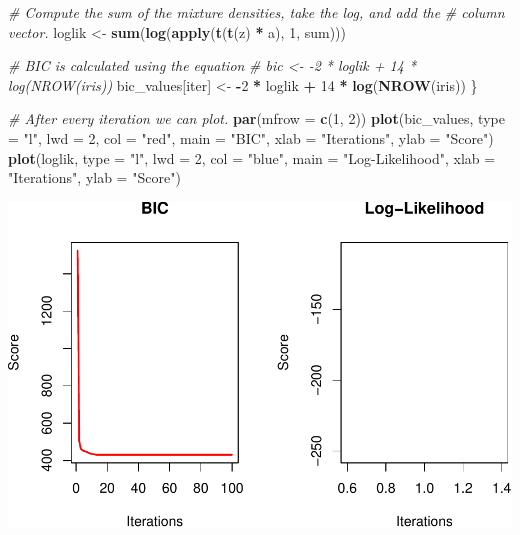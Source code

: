 \documentclass[12pt]{article}
\newenvironment{Shaded}{\begin{snugshade}}{\end{snugshade}}
\newcommand{\AttributeTok}[1]{\textcolor[rgb]{0.13,0.29,0.53}{#1}}
\newcommand{\CommentTok}[1]{\textcolor[rgb]{0.56,0.35,0.01}{\textit{#1}}}
\newcommand{\DecValTok}[1]{\textcolor[rgb]{0.00,0.00,0.81}{#1}}
\newcommand{\FunctionTok}[1]{\textcolor[rgb]{0.13,0.29,0.53}{\textbf{#1}}}
\newcommand{\NormalTok}[1]{#1}
\newcommand{\OtherTok}[1]{\textcolor[rgb]{0.56,0.35,0.01}{#1}}
\newcommand{\SpecialCharTok}[1]{\textcolor[rgb]{0.81,0.36,0.00}{\textbf{#1}}}
\newcommand{\StringTok}[1]{\textcolor[rgb]{0.31,0.60,0.02}{#1}}
\begin{document}
\begin{Shaded}
\begin{Highlighting}[]
\CommentTok{\# Compute the sum of the mixture densities, take the log, and add the}
\CommentTok{\# column vector.}
\NormalTok{loglik }\OtherTok{\textless{}{-}} \FunctionTok{sum}\NormalTok{(}\FunctionTok{log}\NormalTok{(}\FunctionTok{apply}\NormalTok{(}\FunctionTok{t}\NormalTok{(}\FunctionTok{t}\NormalTok{(z) }\SpecialCharTok{*}\NormalTok{ a), }\DecValTok{1}\NormalTok{, sum)))}

\CommentTok{\# BIC is calculated using the equation}
\CommentTok{\# bic \textless{}{-} {-}2 * loglik + 14 * log(NROW(iris))}
\NormalTok{bic\_values[iter] }\OtherTok{\textless{}{-}} \SpecialCharTok{{-}}\DecValTok{2} \SpecialCharTok{*}\NormalTok{ loglik }\SpecialCharTok{+} \DecValTok{14} \SpecialCharTok{*} \FunctionTok{log}\NormalTok{(}\FunctionTok{NROW}\NormalTok{(iris))}
\NormalTok{\}}
\end{Highlighting}
\end{Shaded}

\begin{Shaded}
\begin{Highlighting}[]
\CommentTok{\# After every iteration we can plot.}
\FunctionTok{par}\NormalTok{(}\AttributeTok{mfrow =} \FunctionTok{c}\NormalTok{(}\DecValTok{1}\NormalTok{, }\DecValTok{2}\NormalTok{))}
\FunctionTok{plot}\NormalTok{(bic\_values, }\AttributeTok{type =} \StringTok{"l"}\NormalTok{, }\AttributeTok{lwd =} \DecValTok{2}\NormalTok{, }\AttributeTok{col =} \StringTok{"red"}\NormalTok{, }\AttributeTok{main =} \StringTok{"BIC"}\NormalTok{, }\AttributeTok{xlab =} \StringTok{"Iterations"}\NormalTok{, }
    \AttributeTok{ylab =} \StringTok{"Score"}\NormalTok{)}
\FunctionTok{plot}\NormalTok{(loglik, }\AttributeTok{type =} \StringTok{"l"}\NormalTok{, }\AttributeTok{lwd =} \DecValTok{2}\NormalTok{, }\AttributeTok{col =} \StringTok{"blue"}\NormalTok{, }\AttributeTok{main =} \StringTok{"Log{-}Likelihood"}\NormalTok{, }
    \AttributeTok{xlab =} \StringTok{"Iterations"}\NormalTok{, }\AttributeTok{ylab =} \StringTok{"Score"}\NormalTok{)}
\end{Highlighting}
\end{Shaded}

\includegraphics{exposition_files/figure-latex/unnamed-chunk-7-1.pdf}
\end{document}
